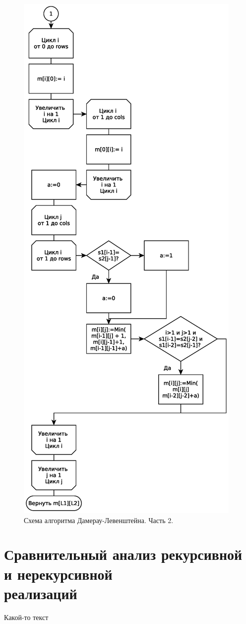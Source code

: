 \begin{figure}
    \centering
    \includegraphics[height=0.9\textheight]{schemes/levenshtein-damerau-eps-2}
    \caption{Схема алгоритма Дамерау-Левенштейна. Часть 2.}
    \label{levenshtein-damerau-scheme-part-2}
\end{figure}

\FloatBarrier

\section{Сравнительный анализ рекурсивной и нерекурсивной\\ реализаций}

Какой-то текст
